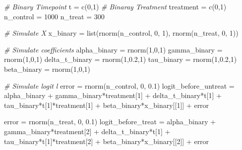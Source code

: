 \documentclass[
]{article}
\newenvironment{Shaded}{\begin{snugshade}}{\end{snugshade}}
\newcommand{\CommentTok}[1]{\textcolor[rgb]{0.56,0.35,0.01}{\textit{#1}}}
\newcommand{\DecValTok}[1]{\textcolor[rgb]{0.00,0.00,0.81}{#1}}
\newcommand{\FloatTok}[1]{\textcolor[rgb]{0.00,0.00,0.81}{#1}}
\newcommand{\FunctionTok}[1]{\textcolor[rgb]{0.00,0.00,0.00}{#1}}
\newcommand{\NormalTok}[1]{#1}
\newcommand{\OtherTok}[1]{\textcolor[rgb]{0.56,0.35,0.01}{#1}}
\newcommand{\SpecialCharTok}[1]{\textcolor[rgb]{0.00,0.00,0.00}{#1}}
\begin{document}
\begin{Shaded}
\begin{Highlighting}[]
\CommentTok{\# Binary Timepoint}
\NormalTok{t }\OtherTok{=} \FunctionTok{c}\NormalTok{(}\DecValTok{0}\NormalTok{,}\DecValTok{1}\NormalTok{)}
\CommentTok{\# Binaray Treatment}
\NormalTok{treatment }\OtherTok{=} \FunctionTok{c}\NormalTok{(}\DecValTok{0}\NormalTok{,}\DecValTok{1}\NormalTok{)}
\NormalTok{n\_control }\OtherTok{=} \DecValTok{1000}
\NormalTok{n\_treat }\OtherTok{=} \DecValTok{300}

\CommentTok{\# Simulate X}
\NormalTok{x\_binary }\OtherTok{=} \FunctionTok{list}\NormalTok{(}\FunctionTok{rnorm}\NormalTok{(n\_control, }\DecValTok{0}\NormalTok{, }\DecValTok{1}\NormalTok{), }\FunctionTok{rnorm}\NormalTok{(n\_treat, }\DecValTok{0}\NormalTok{, }\DecValTok{1}\NormalTok{))}

\CommentTok{\# Simulate coefficients}
\NormalTok{alpha\_binary }\OtherTok{=} \FunctionTok{rnorm}\NormalTok{(}\DecValTok{1}\NormalTok{,}\DecValTok{0}\NormalTok{,}\DecValTok{1}\NormalTok{)}
\NormalTok{gamma\_binary }\OtherTok{=} \FunctionTok{rnorm}\NormalTok{(}\DecValTok{1}\NormalTok{,}\DecValTok{0}\NormalTok{,}\DecValTok{1}\NormalTok{)}
\NormalTok{delta\_t\_binary }\OtherTok{=} \FunctionTok{rnorm}\NormalTok{(}\DecValTok{1}\NormalTok{,}\FloatTok{0.2}\NormalTok{,}\DecValTok{1}\NormalTok{)}
\NormalTok{tau\_binary }\OtherTok{=} \FunctionTok{rnorm}\NormalTok{(}\DecValTok{1}\NormalTok{,}\FloatTok{0.2}\NormalTok{,}\DecValTok{1}\NormalTok{)}
\NormalTok{beta\_binary }\OtherTok{=} \FunctionTok{rnorm}\NormalTok{(}\DecValTok{1}\NormalTok{,}\DecValTok{0}\NormalTok{,}\DecValTok{1}\NormalTok{)}
 
\CommentTok{\# Simulate logit l }
\NormalTok{error }\OtherTok{=} \FunctionTok{rnorm}\NormalTok{(n\_control, }\DecValTok{0}\NormalTok{, }\FloatTok{0.1}\NormalTok{)}
\NormalTok{logit\_before\_untreat }\OtherTok{=}\NormalTok{ alpha\_binary }\SpecialCharTok{+}\NormalTok{ gamma\_binary}\SpecialCharTok{*}\NormalTok{treatment[}\DecValTok{1}\NormalTok{] }\SpecialCharTok{+}\NormalTok{ delta\_t\_binary}\SpecialCharTok{*}\NormalTok{t[}\DecValTok{1}\NormalTok{] }\SpecialCharTok{+} 
\NormalTok{  tau\_binary}\SpecialCharTok{*}\NormalTok{t[}\DecValTok{1}\NormalTok{]}\SpecialCharTok{*}\NormalTok{treatment[}\DecValTok{1}\NormalTok{] }\SpecialCharTok{+}\NormalTok{ beta\_binary}\SpecialCharTok{*}\NormalTok{x\_binary[[}\DecValTok{1}\NormalTok{]] }\SpecialCharTok{+}\NormalTok{ error}

\NormalTok{error }\OtherTok{=} \FunctionTok{rnorm}\NormalTok{(n\_treat, }\DecValTok{0}\NormalTok{, }\FloatTok{0.1}\NormalTok{)}
\NormalTok{logit\_before\_treat }\OtherTok{=}\NormalTok{ alpha\_binary }\SpecialCharTok{+}\NormalTok{ gamma\_binary}\SpecialCharTok{*}\NormalTok{treatment[}\DecValTok{2}\NormalTok{] }\SpecialCharTok{+}\NormalTok{ delta\_t\_binary}\SpecialCharTok{*}\NormalTok{t[}\DecValTok{1}\NormalTok{] }\SpecialCharTok{+} 
\NormalTok{  tau\_binary}\SpecialCharTok{*}\NormalTok{t[}\DecValTok{1}\NormalTok{]}\SpecialCharTok{*}\NormalTok{treatment[}\DecValTok{2}\NormalTok{] }\SpecialCharTok{+}\NormalTok{ beta\_binary}\SpecialCharTok{*}\NormalTok{x\_binary[[}\DecValTok{2}\NormalTok{]] }\SpecialCharTok{+}\NormalTok{ error}


\end{Highlighting}
\end{Shaded}
\end{document}
